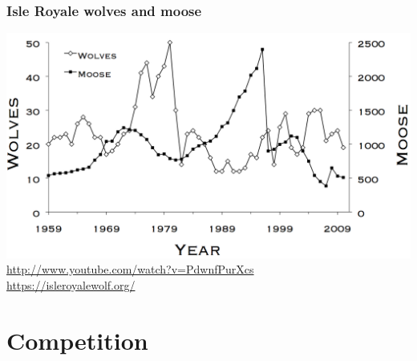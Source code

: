 \documentclass[color=usenames,dvipsnames]{beamer}\usepackage[]{graphicx}\usepackage[]{xcolor}
\begin{document}
\begin{frame}
  \frametitle{Isle Royale wolves and moose}
  \centering
  \includegraphics[width=1\textwidth]{figs/Fig01_wolfmoosechronology} \\
  \vfill
  \url{
    http://www.youtube.com/watch?v=PdwnfPurXcs
  } \\
  \url{
    https://isleroyalewolf.org/
  }
\end{frame}



\section{Competition}
\end{document}
